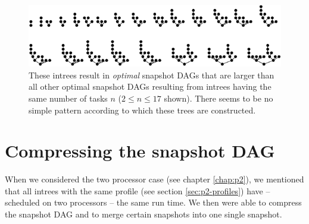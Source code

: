 \begin{figure}[t]
  \centering
  \includegraphics[scale=1.4]{p3/max_snapshot_dag.pdf}
  \caption{These intrees result in \emph{optimal} snapshot DAGs that are larger than all other optimal snapshot DAGs resulting from intrees having the same number of tasks $n$ ($2 \leq n \leq 17$ shown). There seems to be no simple pattern according to which these trees are constructed.}
  \label{fig:intrees-maximum-snapshot-dag-size-p3}
\end{figure}




\section{Compressing the snapshot DAG}
\label{sec:p3-compress-snapshots}

When we considered the two processor case (see chapter \ref{chap:p2}), we mentioned that all intrees with the same profile (see section \ref{sec:p2-profiles}) have -- scheduled on two processors -- the same run time. We then were able to compress the snapshot DAG and to merge certain snapshots into one single snapshot.

